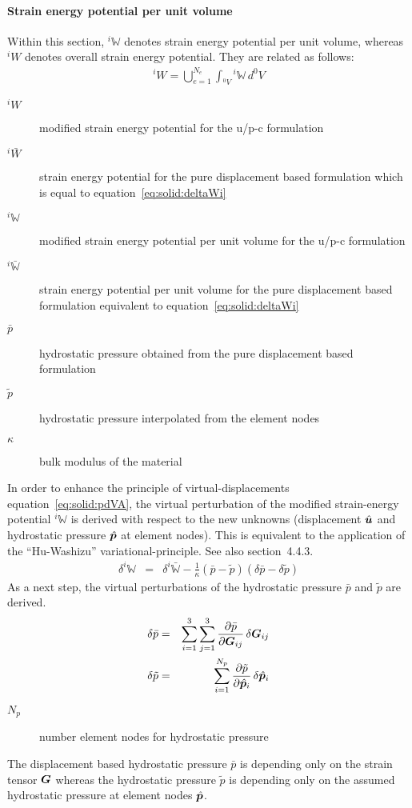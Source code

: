 \paragraph{Strain energy potential per unit volume}
Within this section, $^i\mathbb{W}$ denotes strain energy potential per unit volume, whereas $^iW$ denotes overall strain energy potential.
They are related as follows:
\begin{eqnarray}
^iW = \bigcup_{e=1}^{N_e}\int_{^0V} {}^i\mathbb{W} \, d^0V
\end{eqnarray}
\begin{description}
\item[$^iW$] modified strain energy potential for the u/p-c formulation
\item[$^i\bar{W}$] strain energy potential for the pure displacement based formulation which is equal to equation~\ref{eq:solid:deltaWi}
\item[$^i\mathbb{W}$] modified strain energy potential per unit volume for the u/p-c formulation
\item[$^i\bar{\mathbb{W}}$] strain energy potential per unit volume for the pure displacement based formulation equivalent to equation~\ref{eq:solid:deltaWi}
\item[$\bar{p}$] hydrostatic pressure obtained from the pure displacement based formulation
\item[$\tilde{p}$] hydrostatic pressure interpolated from the element nodes
\item[$\kappa$] bulk modulus of the material
\end{description}
In order to enhance the principle of virtual-displacements equation~\ref{eq:solid:pdVA},
the virtual perturbation of the modified strain-energy potential $^i\mathbb{W}$ is derived
with respect to the new unknowns (displacement $\hat{\bm{u}}$ and hydrostatic pressure $\hat{\bm{p}}$ at element nodes).
This is equivalent to the application of the ``Hu-Washizu'' variational-principle. See also \cite{BATHE2016} section~4.4.3.
\begin{eqnarray}
\delta^i\mathbb{W} & = & \delta^i\bar{\mathbb{W}} - \frac{1}{\kappa}\left(\bar{p} - \tilde{p}\right)\left(\delta\bar{p} - \delta\tilde{p}\right) \label{eq:solid:upc:deltaW}
\end{eqnarray}
As a next step, the virtual perturbations of the hydrostatic pressure $\bar{p}$ and $\tilde{p}$ are derived.
\begin{eqnarray}
\delta\bar{p} & = & \sum_{i=1}^{3}\sum_{j=1}^{3}\frac{\partial \bar{p}}{\partial \boldsymbol{G}_{ij}}\,\delta\boldsymbol{G}_{ij} \label{eq:solid:upc:delta:p:bar} \\
\delta\tilde{p} & = & \sum_{i=1}^{N_p}\frac{\partial \tilde{p}}{\partial \hat{\bm{p}}_i}\,\delta\hat{\bm{p}}_i \label{eq:solid:upc:delta:p:tilde}
\end{eqnarray}
\begin{description}
\item[$N_p$] number element nodes for hydrostatic pressure
\end{description}
The displacement based hydrostatic pressure $\bar{p}$ is depending only on the strain tensor $\bm{G}$
whereas the hydrostatic pressure $\tilde{p}$ is depending only on the assumed hydrostatic pressure at element nodes $\hat{\bm{p}}$.
